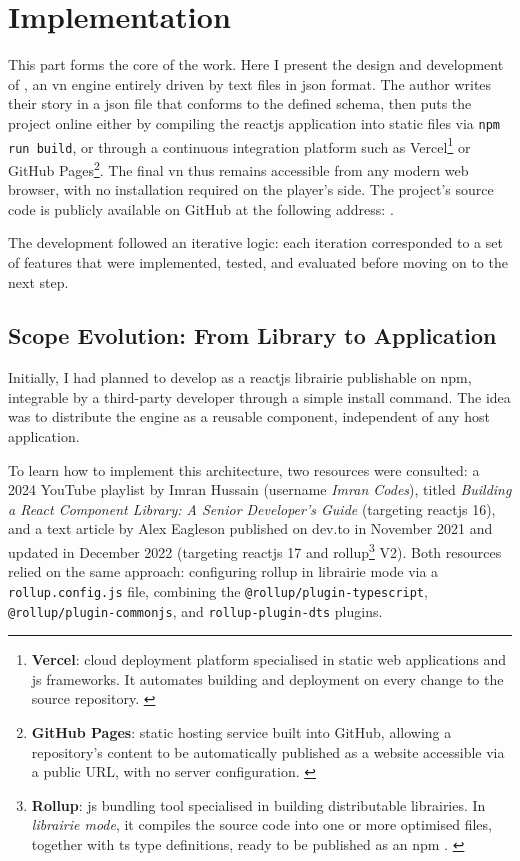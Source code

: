 \section{Implementation}
\label{chap:MediaProject}

This part forms the core of the work. Here I present the design and development of \textbf{\ns}, an  \gls{vn} engine entirely driven by text files in \gls{json} format. The author writes their story in a \gls{json} file that conforms to the defined \gls{schema}, then puts the project online either by compiling the \gls{reactjs} application into static files via \texttt{npm run build}, or through a continuous integration platform such as Vercel\footnote{\textbf{Vercel}: cloud deployment platform specialised in static web applications and \gls{js} frameworks. It automates building and deployment on every change to the source repository. \parencite{noauthor_vercel_nodate}} or GitHub Pages\footnote{\textbf{GitHub Pages}: static hosting service built into GitHub, allowing a repository's content to be automatically published as a website accessible via a public URL, with no server configuration. \parencite{noauthor_documentation_nodate}}. The final \gls{vn} thus remains accessible from any modern web browser, with no installation required on the player's side. The project's source code is publicly available on GitHub at the following address: \nsrepo.

The development followed an iterative logic: each iteration corresponded to a set of features that were implemented, tested, and evaluated before moving on to the next step.


\subsection{Scope Evolution: From Library to Application}

Initially, I had planned to develop \nsits as a \gls{reactjs} \gls{librairie} publishable on \gls{npm}, integrable by a third-party developer through a simple install command. The idea was to distribute the engine as a reusable component, independent of any host application.

To learn how to implement this architecture, two resources were consulted: a 2024 YouTube playlist by Imran Hussain (username \textit{Imran Codes}), titled \textit{Building a React Component Library: A Senior Developer's Guide}\parencite{imran_codes_1_2024} (targeting \gls{reactjs} 16), and a text article by Alex Eagleson published on dev.to in November 2021 and updated in December 2022 \parencite{noauthor_how_2021} (targeting \gls{reactjs} 17 and rollup\footnote{\textbf{Rollup}: \gls{js} bundling tool specialised in building distributable \gls{librairie}s. In \textit{\gls{librairie} mode}, it compiles the source code into one or more optimised files, together with \gls{ts} type definitions, ready to be published as an \gls{npm} . \parencite{noauthor_introduction_nodate}} V2). Both resources relied on the same approach: configuring rollup in \gls{librairie} mode via a \texttt{rollup.config.js} file, combining the \texttt{@rollup/plugin-typescript}, \texttt{@rollup/plugin-commonjs}, and \texttt{rollup-plugin-dts} \glspl{plugin}.

